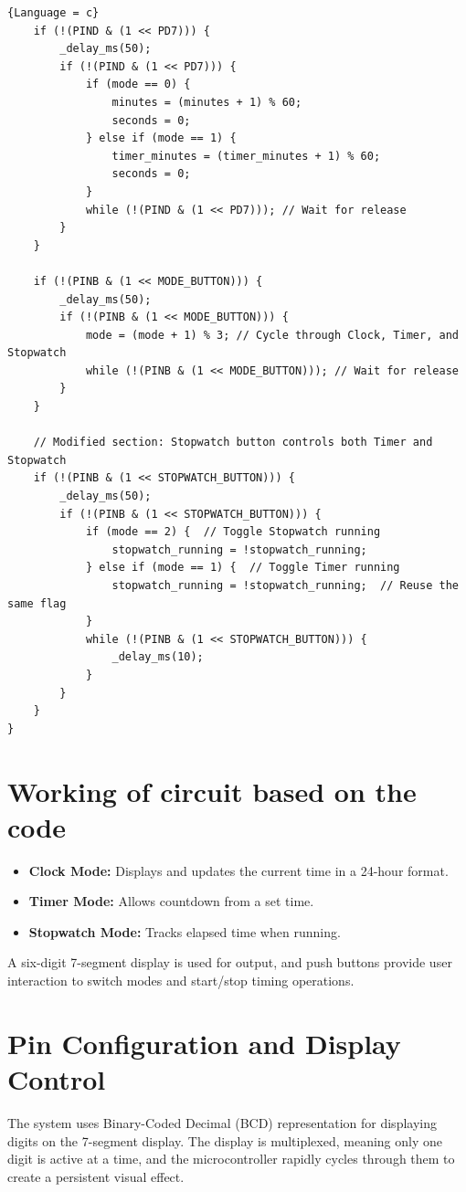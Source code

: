 \documentclass[a4paper,12pt]{article}
\begin{document}
\begin{lstlisting}{Language = c}
    if (!(PIND & (1 << PD7))) {
        _delay_ms(50);
        if (!(PIND & (1 << PD7))) {
            if (mode == 0) {
                minutes = (minutes + 1) % 60;
                seconds = 0;
            } else if (mode == 1) {
                timer_minutes = (timer_minutes + 1) % 60;
                seconds = 0;
            }
            while (!(PIND & (1 << PD7))); // Wait for release
        }
    }

    if (!(PINB & (1 << MODE_BUTTON))) {
        _delay_ms(50);
        if (!(PINB & (1 << MODE_BUTTON))) {
            mode = (mode + 1) % 3; // Cycle through Clock, Timer, and Stopwatch
            while (!(PINB & (1 << MODE_BUTTON))); // Wait for release
        }
    }

    // Modified section: Stopwatch button controls both Timer and Stopwatch
    if (!(PINB & (1 << STOPWATCH_BUTTON))) {
        _delay_ms(50);
        if (!(PINB & (1 << STOPWATCH_BUTTON))) {
            if (mode == 2) {  // Toggle Stopwatch running
                stopwatch_running = !stopwatch_running;
            } else if (mode == 1) {  // Toggle Timer running
                stopwatch_running = !stopwatch_running;  // Reuse the same flag
            }
            while (!(PINB & (1 << STOPWATCH_BUTTON))) {
                _delay_ms(10);
            }
        }
    }
}
\end{lstlisting}

\section{Working of circuit based on the code}
\begin{itemize}
    \item \textbf{Clock Mode:} Displays and updates the current time in a 24-hour format.
    \item \textbf{Timer Mode:} Allows countdown from a set time.
    \item \textbf{Stopwatch Mode:} Tracks elapsed time when running.
\end{itemize}

A six-digit 7-segment display is used for output, and push buttons provide user interaction to switch modes and start/stop timing operations.

\section*{Pin Configuration and Display Control}

The system uses Binary-Coded Decimal (BCD) representation for displaying digits on the 7-segment display. The display is multiplexed, meaning only one digit is active at a time, and the microcontroller rapidly cycles through them to create a persistent visual effect.
\end{document}
